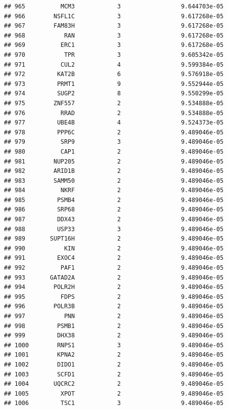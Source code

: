 \documentclass[
]{article}
\begin{document}
\begin{verbatim}
## 965          MCM3            3                 9.644703e-05
## 966        NSFL1C            3                 9.617268e-05
## 967        FAM83H            3                 9.617268e-05
## 968           RAN            3                 9.617268e-05
## 969          ERC1            3                 9.617268e-05
## 970           TPR            3                 9.605342e-05
## 971          CUL2            4                 9.599384e-05
## 972         KAT2B            6                 9.576918e-05
## 973         PRMT1            9                 9.552944e-05
## 974         SUGP2            8                 9.550299e-05
## 975        ZNF557            2                 9.534888e-05
## 976          RRAD            2                 9.534888e-05
## 977         UBE4B            4                 9.524373e-05
## 978         PPP6C            2                 9.489046e-05
## 979          SRP9            3                 9.489046e-05
## 980          CAP1            2                 9.489046e-05
## 981        NUP205            2                 9.489046e-05
## 982        ARID1B            2                 9.489046e-05
## 983        SAMM50            2                 9.489046e-05
## 984          NKRF            2                 9.489046e-05
## 985         PSMB4            2                 9.489046e-05
## 986         SRP68            2                 9.489046e-05
## 987         DDX43            2                 9.489046e-05
## 988         USP33            3                 9.489046e-05
## 989       SUPT16H            2                 9.489046e-05
## 990           KIN            2                 9.489046e-05
## 991         EXOC4            2                 9.489046e-05
## 992          PAF1            2                 9.489046e-05
## 993       GATAD2A            2                 9.489046e-05
## 994        POLR2H            2                 9.489046e-05
## 995          FDPS            2                 9.489046e-05
## 996        POLR3B            2                 9.489046e-05
## 997           PNN            2                 9.489046e-05
## 998         PSMB1            2                 9.489046e-05
## 999         DHX38            2                 9.489046e-05
## 1000        RNPS1            3                 9.489046e-05
## 1001        KPNA2            2                 9.489046e-05
## 1002        DIDO1            2                 9.489046e-05
## 1003        SCFD1            2                 9.489046e-05
## 1004       UQCRC2            2                 9.489046e-05
## 1005         XPOT            2                 9.489046e-05
## 1006         TSC1            3                 9.489046e-05

\end{verbatim}
\end{document}
